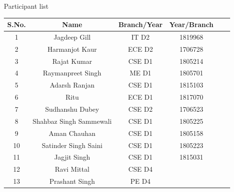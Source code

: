 \documentclass[12pt, a4 paper]{article}
\begin{document}
\begin{center}
\huge Participant list
\end{center}

\begin{table}[h!]
  \begin{center}
    \begin{tabular}{|c|c|c|c|c|c|} 
    \toprule %
      \textbf{S.No.} & \textbf{Name} & \textbf{Branch/Year } &\textbf{Year/Branch}\\
      \midrule %
      1	 & Jagdeep Gill	           & IT	 D2 & 1819968 \\
      2	 & Harmanjot Kaur	       & ECE D2	& 1706728 \\
      3	 & Rajat Kumar	           & CSE D1	& 1805214 \\
      4	 & Raymanpreet Singh	   & ME	 D1	& 1805701 \\
      5	 & Adarsh Ranjan	       & CSE D1	& 1815103 \\
      6	 & Ritu	                   & ECE D1	& 1817070 \\
      7	 & Sudhanshu Dubey	       & CSE D2	& 1706523 \\
      8	 & Shahbaz Singh Sammewali & CSE D1	& 1805225 \\
      9	 & Aman Chauhan	           & CSE D1	& 1805158 \\
      10 & Satinder Singh Saini	   & CSE D1	& 1805223 \\
      11 & Jagjit Singh	           & CSE D1	& 1815031 \\
      12 & Ravi Mittal	           & CSE D4	&         \\
      13 & Prashant Singh	       & PE	 D4	&         \\

      \bottomrule %
    \end{tabular}
  \end{center}
\end{table}
\end{document}
